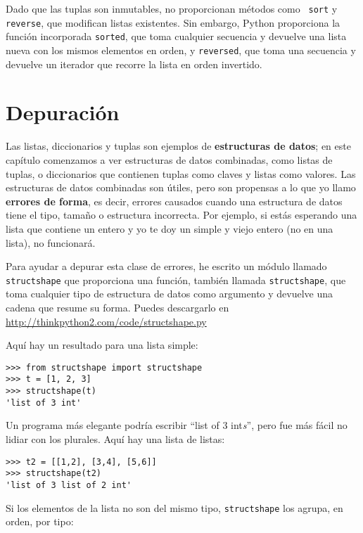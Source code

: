 \documentclass[10pt]{book}
\begin{document}
Dado que las tuplas son inmutables, no proporcionan métodos como {\tt
  sort} y {\tt reverse}, que modifican listas existentes.  Sin embargo, Python
proporciona la función incorporada {\tt sorted}, que toma cualquier secuencia
y devuelve una lista nueva con los mismos elementos en orden, y
{\tt reversed}, que toma una secuencia y devuelve un iterador que
recorre la lista en orden invertido.
 


\section{Depuración}

Las listas, diccionarios y tuplas son ejemplos de {\bf estructuras
  de datos}; en este capítulo comenzamos a ver estructuras de datos
combinadas, como listas de tuplas, o diccionarios que contienen tuplas
como claves y listas como valores.  Las estructuras de datos combinadas son útiles,
pero son propensas a lo que yo llamo {\bf errores de forma}, es decir, errores
causados cuando una estructura de datos tiene el tipo, tamaño o estructura
incorrecta. Por ejemplo, si estás esperando una lista que contiene un entero y yo
te doy un simple y viejo entero (no en una lista), no funcionará.

Para ayudar a depurar esta clase de errores, he escrito un módulo
llamado {\tt structshape} que proporciona una función, también llamada
{\tt structshape}, que toma cualquier tipo de estructura de datos como
argumento y devuelve una cadena que resume su forma.
Puedes descargarlo en \url{http://thinkpython2.com/code/structshape.py}

Aquí hay un resultado para una lista simple:

\begin{verbatim}
>>> from structshape import structshape
>>> t = [1, 2, 3]
>>> structshape(t)
'list of 3 int'
\end{verbatim}
%
Un programa más elegante podría escribir ``list of 3 int{\em s}'', pero
fue más fácil no lidiar con los plurales.  Aquí hay una lista de listas:

\begin{verbatim}
>>> t2 = [[1,2], [3,4], [5,6]]
>>> structshape(t2)
'list of 3 list of 2 int'
\end{verbatim}
%
Si los elementos de la lista no son del mismo tipo,
{\tt structshape} los agrupa, en orden, por tipo:
\end{document}
